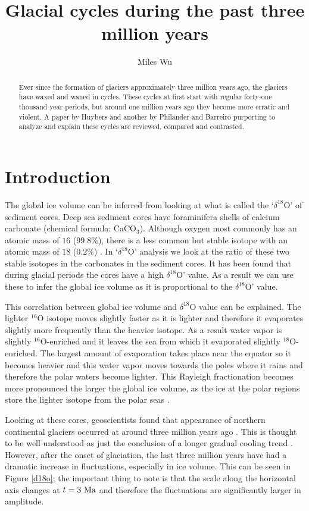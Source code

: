 \documentclass[11pt]{article}
\begin{document}
\title{Glacial cycles during the past three million years}
\author{Miles Wu}
\maketitle

\begin{abstract}
Ever since the formation of glaciers approximately three million years ago, the glaciers have waxed and waned in cycles. These cycles at first start with regular forty-one thousand year periods, but around one million years ago they become more erratic and violent. A paper by Huybers and another by Philander and Barreiro purporting to analyze and explain these cycles are reviewed, compared and contrasted.
\end{abstract}

\section{Introduction}
The global ice volume can be inferred from looking at what is called the `$\delta^{18}$O' of sediment cores.
Deep sea sediment cores have foraminifera shells of calcium carbonate (chemical formula: CaCO$_3$).
Although oxygen most commonly has an atomic mass of $16$ ($99.8\%$), there is a less common but stable isotope with an atomic mass of $18$ ($0.2\%$) \cite{viu}.
In `$\delta^{18}$O' analysis we look at the ratio of these two stable isotopes in the carbonates in the sediment cores.
It has been found that during glacial periods the cores have a high $\delta^{18}$O' value.
As a result we can use these to infer the global ice volume as it is proportional to the $\delta^{18}$O' value.

This correlation between global ice volume and $\delta^{18}$O value can be explained.
The lighter $^{16}$O isotope moves slightly faster as it is lighter and therefore it evaporates slightly more frequently than the heavier isotope.
As a result water vapor is slightly $^{16}$O-enriched and it leaves the sea from which it evaporated slightly $^{18}$O-enriched.
The largest amount of evaporation takes place near the equator so it becomes heavier and this water vapor moves towards the poles where it rains and therefore the polar waters become lighter.
This Rayleigh fractionation becomes more pronounced the larger the global ice volume, as the ice at the polar regions store the lighter isotope from the polar seas \cite{viu}.

Looking at these cores, geoscientists found that appearance of northern continental glaciers occurred at around three million years ago \cite{fedorov}.
This is thought to be well understood as just the conclusion of a longer gradual cooling trend \cite{huybers}.
However, after the onset of glaciation, the last three million years have had a dramatic increase in fluctuations, especially in ice volume.
This can be seen in Figure \ref{d18o}; the important thing to note is that the scale along the horizontal axis changes at $t=3~\textnormal{Ma}$ and therefore the fluctuations are significantly larger in amplitude.
\end{document}
